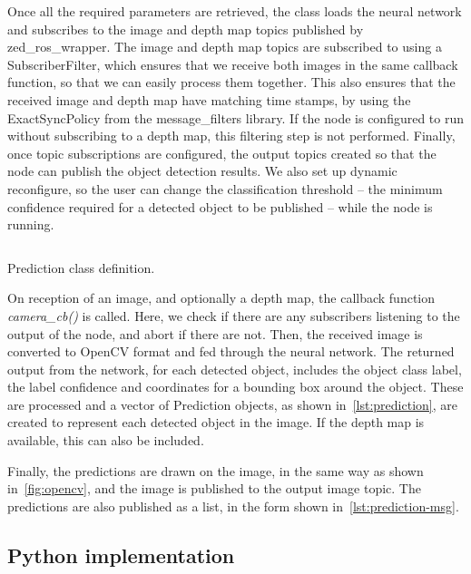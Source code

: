 \documentclass[\rootfolder/main.tex]{subfiles}
\begin{document}
Once all the required parameters are retrieved, the class loads the neural network and subscribes to the image and depth map topics published by zed\_ros\_wrapper.
The image and depth map topics are subscribed to using a SubscriberFilter, which ensures that we receive both images in the same callback function, so that we can easily process them together.
This also ensures that the received image and depth map have matching time stamps, by using the ExactSyncPolicy from the message\_filters library.
If the node is configured to run without subscribing to a depth map, this filtering step is not performed.
Finally, once topic subscriptions are configured, the output topics created so that the node can publish the object detection results.
We also set up dynamic reconfigure, so the user can change the classification threshold -- the minimum confidence required for a detected object to be published -- while the node is running.

\begin{listing}
    \inputminted{cpp}{\rootfolder/Chapters/Chapter5/Listings/Prediction}
    \caption{Prediction class definition.}
    \label{lst:prediction}
\end{listing}

On reception of an image, and optionally a depth map, the callback function \emph{camera\_cb()} is called.
Here, we check if there are any subscribers listening to the output of the node, and abort if there are not.
Then, the received image is converted to OpenCV format and fed through the neural network.
The returned output from the network, for each detected object, includes the object class label, the label confidence and coordinates for a bounding box around the object.
These are processed and a vector of Prediction objects, as shown in~\cref{lst:prediction}, are created to represent each detected object in the image.
If the depth map is available, this can also be included.

Finally, the predictions are drawn on the image, in the same way as shown in~\cref{fig:opencv}, and the image is published to the output image topic.
The predictions are also published as a list, in the form shown in~\cref{lst:prediction-msg}.


\subsection{Python implementation}
\end{document}

